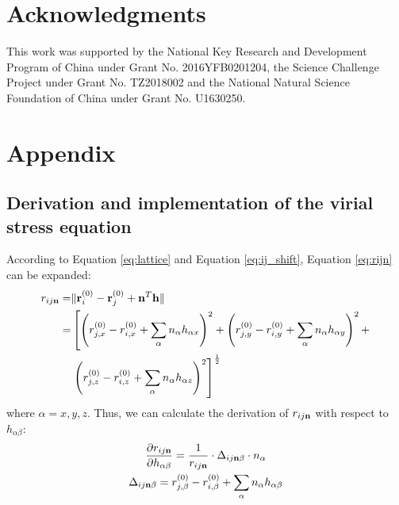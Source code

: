 \documentclass[final,1p,times]{elsarticle}
\begin{document}
% 
%
\section*{Acknowledgments}

This work was supported by the National Key Research and Development Program of 
China under Grant No. 2016YFB0201204, the Science Challenge Project under Grant 
No. TZ2018002 and the National Natural Science Foundation of China under Grant 
No. U1630250.

% 
%




% 
%
\section*{Appendix}
\label{section:appendix}

% 
%
\subsection{Derivation and implementation of the virial stress equation}

According to Equation \ref{eq:lattice} and Equation \ref{eq:ij_shift}, Equation 
\ref{eq:rijn} can be expanded:
\begin{align}
r_{ij\mathbf{n}} = & \Vert \mathbf{r}_i^{(0)} - \mathbf{r}_j^{(0)} + 
           \mathbf{n}^T \mathbf{h} \Vert \nonumber \\
      = & \left[
                 \left(r_{j,x}^{(0)} - r_{i,x}^{(0)} + 
                       \sum_{\alpha}{n_{\alpha}h_{\alpha x}} \right)^2 +
                 \left(r_{j,y}^{(0)} - r_{i,y}^{(0)} + 
                       \sum_{\alpha}{n_{\alpha}h_{\alpha y}} \right)^2 + \right.
        \nonumber \\
        & \left. \left(r_{j,z}^{(0)} - r_{i,z}^{(0)} + 
                       \sum_{\alpha}{n_{\alpha}h_{\alpha z}} \right)^2 
          \right]^{\frac{1}{2}}
\end{align}
where $\alpha=x,y,z$. Thus, we can calculate the derivation of $r_{ij\mathbf{n}}$ with 
respect to $h_{\alpha\beta}$:
\begin{gather}
\frac{\partial r_{ij\mathbf{n}}}{\partial h_{\alpha\beta}} = 
    \frac{1}{r_{ij\mathbf{n}}} \cdot \Delta_{ij\mathbf{n}\beta} \cdot n_{\alpha} \\
\Delta_{ij\mathbf{n}\beta} = r_{j,\beta}^{(0)} - r_{i,\beta}^{(0)} + 
    \sum_{\alpha}{n_{\alpha}h_{\alpha \beta}}
\end{gather}
\end{document}
